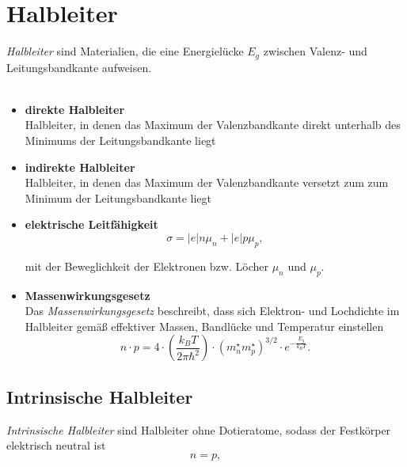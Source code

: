 \documentclass{article}
\newcommand{\lr}[1]{\left(#1\right)}
\begin{document}
\newpage


\section{Halbleiter}
\textit{Halbleiter} sind Materialien, die eine Energielücke $E_g$ zwischen Valenz- und Leitungsbandkante aufweisen.\\
\\
	\begin{itemize}
		\item \textbf{direkte Halbleiter}\\
		Halbleiter, in denen das Maximum der Valenzbandkante direkt unterhalb des Minimums der Leitungsbandkante liegt
		
		\item \textbf{indirekte Halbleiter}\\
		Halbleiter, in denen das Maximum der Valenzbandkante versetzt zum zum Minimum der Leitungsbandkante liegt
	\end{itemize}


	\begin{itemize}
		\item \textbf{elektrische Leitfähigkeit}\\
			\begin{equation}
				\sigma = |e| n \mu_n + |e| p \mu_p,
			\end{equation}

		mit der Beweglichkeit der Elektronen bzw. Löcher $\mu_n$ und $\mu_p$.
		
		
		\item \textbf{Massenwirkungsgesetz}\\
		Das \textit{Massenwirkungsgesetz} beschreibt, dass sich Elektron- und Lochdichte im Halbleiter gemäß effektiver Massen, Bandlücke und Temperatur einstellen
			\begin{equation}
				n \cdot p = 4 \cdot \lr{ \frac{k_B T}{2\pi\hbar^2} } \cdot \lr{ m_n^\star m_p^\star }^{3/2} \cdot e^{-\frac{E_g}{k_B T}}.
			\end{equation}
	\end{itemize}	


\newpage


\subsection{Intrinsische Halbleiter}
\textit{Intrinsische Halbleiter} sind Halbleiter ohne Dotieratome, sodass der Festkörper elektrisch neutral ist
	\begin{equation}
		n = p,
	\end{equation}
\end{document}
